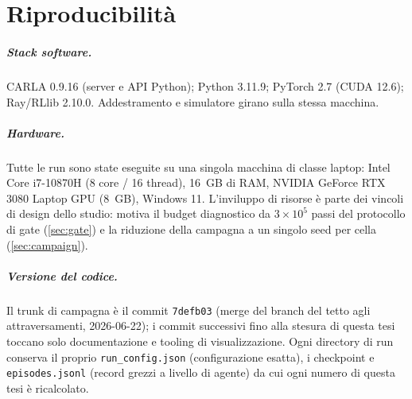 \chapter{Riproducibilità}
\label{app:repro}

\paragraph{Stack software.}
CARLA 0.9.16 (server e API Python); Python 3.11.9; PyTorch 2.7
(CUDA 12.6); Ray/RLlib 2.10.0. Addestramento e simulatore girano sulla
stessa macchina.

\paragraph{Hardware.}
Tutte le run sono state eseguite su una singola macchina di classe
laptop: Intel Core i7-10870H (8 core / 16 thread), \SI{16}{GB} di RAM,
NVIDIA GeForce RTX 3080 Laptop GPU (\SI{8}{GB}), Windows 11.
L'inviluppo di risorse è parte dei vincoli di design dello studio:
motiva il budget diagnostico da $3\times10^{5}$ passi del protocollo di
gate (\cref{sec:gate}) e la riduzione della campagna a un singolo seed
per cella (\cref{sec:campaign}).

\paragraph{Versione del codice.}
Il trunk di campagna è il commit \texttt{7defb03} (merge del branch del
tetto agli attraversamenti, 2026-06-22); i commit successivi fino alla
stesura di questa tesi toccano solo documentazione e tooling di
visualizzazione. Ogni directory di run conserva il proprio
\texttt{run\_config.json} (configurazione esatta), i checkpoint e
\texttt{episodes.jsonl} (record grezzi a livello di agente) da cui ogni
numero di questa tesi è ricalcolato.


